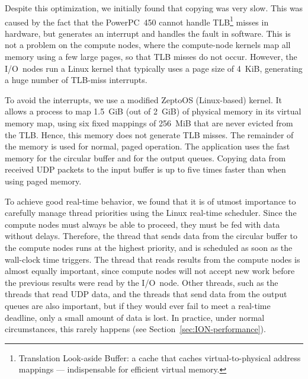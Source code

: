 \documentclass{sig-alternate}
\begin{document}
Despite this optimization, we initially found that copying was very slow.
This was caused by the fact that the PowerPC~450 cannot handle
TLB\footnote{Translation Look-aside Buffer: a cache that caches
virtual-to-physical address mappings --- indispensable for efficient virtual
memory.} misses in hardware, but generates an interrupt and handles the fault
in software.
This is not a problem on the compute nodes, where the compute-node kernels 
map all memory using a few large pages, so that TLB misses do not occur.
However, the I/O~nodes run a Linux kernel that typically uses a page size of
4~KiB, generating a huge number of TLB-miss interrupts.

To avoid the interrupts, we use a modified ZeptoOS (Linux-based)
kernel\cite{Yoshii:09}.
It allows a process to map 1.5~GiB (out of 2~GiB) of physical memory in its
virtual memory map, using six fixed mappings of 256~MiB that are never evicted
from the TLB.
Hence, this memory does not generate TLB misses.
The remainder of the memory is used for normal, paged operation.
The application uses the fast memory for the circular buffer and for the
output queues.
Copying data from received UDP packets to the input buffer is up to five times
faster than when using paged memory.

To achieve good real-time behavior, we found that it is of utmost importance
to carefully manage thread priorities using the Linux real-time scheduler.
Since the compute nodes must always be able to proceed, they must be fed with
data without delays.
Therefore, the thread that sends data from the circular buffer to the
compute nodes runs at the highest priority, and is scheduled as soon as the
wall-clock time triggers.
The thread that reads results from the compute nodes is almost equally
important, since compute nodes will not accept new work before the previous
results were read by the I/O~node.
Other threads, such as the threads that read UDP data, and the threads that
send data from the output queues are also important, but if they would ever
fail to meet a real-time deadline, only a small amount of data is lost.
In practice, under normal circumstances, this rarely happens
(see Section~\ref{sec:ION-performance}).

\end{document}
